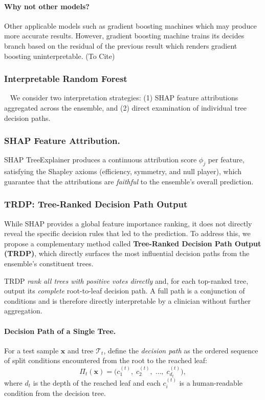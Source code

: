 \documentclass[letterpaper]{article} %
\begin{document}
\paragraph{Why not other models?}
Other applicable models such as gradient boosting machines which may produce more accurate results. However, gradient boosting machine trains its decides branch based on the residual of the previous result which renders gradient boosting uninterpretable. (To Cite)


\subsubsection{Interpretable Random Forest}
\
\newline
We consider two interpretation strategies: (1) SHAP feature attributions aggregated across the ensemble, and (2) direct examination of individual tree decision paths.

\subsubsection{SHAP Feature Attribution.}
SHAP TreeExplainer \cite{Lundberg2020} produces a continuous attribution score $\phi_j$ per feature, satisfying the Shapley axioms (efficiency, symmetry, and null player), which guarantee that the attributions are \emph{faithful} to the ensemble's overall prediction.

\subsubsection{TRDP: Tree-Ranked Decision Path Output}
While SHAP provides a global feature importance ranking, it does not directly reveal the specific decision rules that led to the prediction. To address this, we propose a complementary method called \textbf{Tree-Ranked Decision Path Output (TRDP)}, which directly surfaces the most influential decision paths from the ensemble's constituent trees.

TRDP \emph{rank all trees with positive votes directly} and, for each top-ranked tree, output its \emph{complete} root-to-leaf decision path.  A full path is a conjunction of conditions and is therefore directly interpretable by a clinician without further aggregation.
 
\paragraph{Decision Path of a Single Tree.}
For a test sample $\mathbf{x}$ and tree $\mathcal{T}_t$, define the
\emph{decision path} as the ordered sequence of split conditions
encountered from the root to the reached leaf:
\begin{equation}
    \Pi_t(\mathbf{x}) =
    \bigl(c_1^{(t)},\; c_2^{(t)},\; \ldots,\; c_{d_t}^{(t)}\bigr),
    \label{eq:path}
\end{equation}
where $d_t$ is the depth of the reached leaf and each $c_i^{(t)}$ is a human-readable condition from the decision tree.
\end{document}
